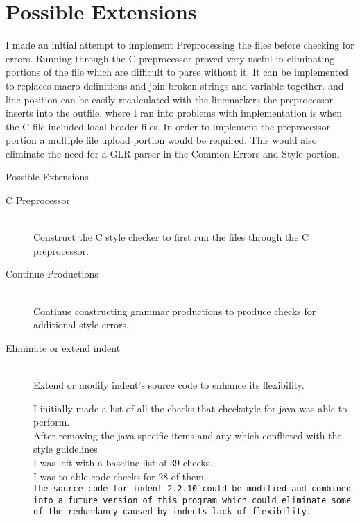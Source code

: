 \documentclass[compress]{beamer}
\begin{document}
\section{Possible Extensions}
	\note
	{
		I made an initial attempt to implement Preprocessing the files before checking for errors. 
		Running through the C preprocessor proved very useful in eliminating portions of the file which are difficult to parse without it.
		It can be implemented to replaces macro definitions and join broken strings and variable together.
		and line position can be easily recalculated with the linemarkers the preprocessor inserts into the outfile.
		where I ran into problems with implementation is when the C file included local header files. 
		In order to implement the preprocessor portion a multiple file upload portion would be required.
		This would also eliminate the need for a GLR parser in the Common Errors and Style portion.
    }
\begin{frame}{Possible Extensions}
\begin{description}
	\item[C Preprocessor] \hfill \\
		Construct the C style checker to first run the files through the C preprocessor.

    \item[Continue Productions] \hfill \\
		Continue constructing grammar productions to produce checks for additional style errors.

	\item[Eliminate or extend indent] \hfill \\
		Extend or modify indent's source code to enhance its flexibility.
	\note
	{
		I initially made a list of all the checks that checkstyle for java was able to perform.\\
		After removing the java specific items and any which conflicted with the style guidelines \\
		I was left with a baseline list of 39 checks. \\
		I was to able code checks for 28 of them.\\
		
		\texttt{the source code for indent 2.2.10 could be modified and combined into a future version of this 
		program which could eliminate some of the redundancy caused by indents lack of flexibility.} 
	
	}
\end{description}

	
\end{frame}
\end{document}
